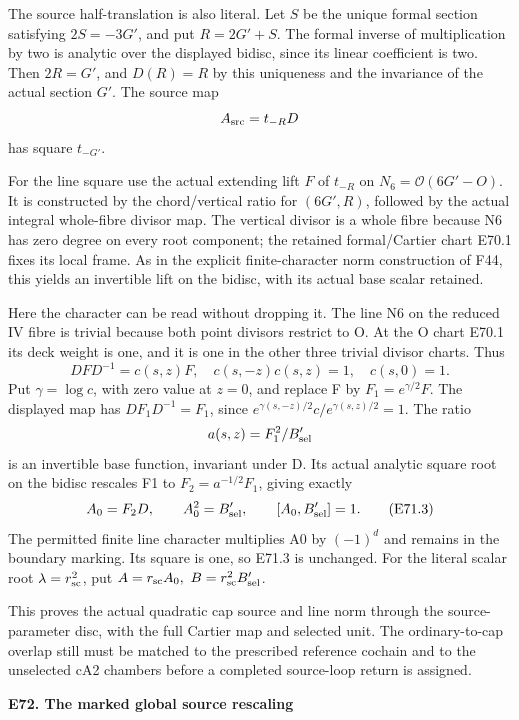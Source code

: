 The source half-translation is also literal. Let \(S\) be the
unique formal section satisfying \(2S=-3G'\), and put \(R=2G'+S\).
The formal inverse of multiplication by two is analytic over the
displayed bidisc, since its linear coefficient is two. Then
\(2R=G'\), and \(D(R)=R\) by this uniqueness and the invariance of
the actual section \(G'\). The source map
\[
 A_{\rm src}=t_{-R}D
\]
has square \(t_{-G'}\).

For the line square use the actual extending lift \(F\) of
\(t_{-R}\) on \(N_6=\mathcal O(6G'-O)\). It is constructed by the
chord/vertical ratio for \((6G',R)\), followed by the actual
integral whole-fibre divisor map. The vertical divisor is a
whole fibre because N6 has zero degree on every root component;
the retained formal/Cartier chart E70.1 fixes its local frame.
As in the explicit finite-character norm construction of F44,
this yields an invertible lift on the bidisc, with its actual
base scalar retained.

Here the character can be read without dropping it. The line N6
on the reduced IV fibre is trivial because both point divisors
restrict to O. At the O chart E70.1 its deck weight is one, and
it is one in the other three trivial divisor charts. Thus
\[
 DFD^{-1}=c(s,z)F,\quad
 c(s,-z)c(s,z)=1,\quad c(s,0)=1.
\]
Put \(\gamma=\log c\), with zero value at \(z=0\), and replace
F by \(F_1=e^{\gamma/2}F\). The displayed map has
\(D F_1D^{-1}=F_1\), since
\(e^{\gamma(s,-z)/2}c/e^{\gamma(s,z)/2}=1\).
The ratio
\[
 a(s,z)=F_1^2/B_{\rm sel}'
\]
is an invertible base function, invariant under D. Its actual
analytic square root on the bidisc rescales F1 to
\(F_2=a^{-1/2}F_1\), giving exactly
\[
 A_0=F_2D,\qquad A_0^2=B_{\rm sel}',\qquad
 [A_0,B_{\rm sel}']=1.                              \tag{E71.3}
\]
The permitted finite line character multiplies A0 by
\((-1)^d\) and remains in the boundary marking. Its square is
one, so E71.3 is unchanged. For the literal scalar root
\(\lambda=r_{\rm sc}^2\), put
\(A=r_{\rm sc}A_0,\ B=r_{\rm sc}^2B_{\rm sel}'\).

This proves the actual quadratic cap source and line norm through
the source-parameter disc, with the full Cartier map and selected
unit. The ordinary-to-cap overlap still must be matched to the
prescribed reference cochain and to the unselected cA2 chambers
before a completed source-loop return is assigned.

\par

\medskip\noindent\textbf{E72. The marked global source rescaling}

